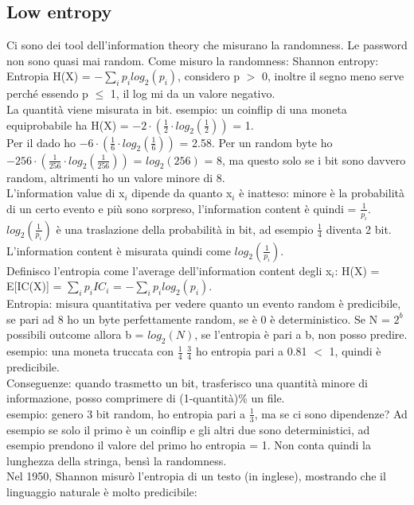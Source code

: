 \documentclass[16px]{article}
\begin{document}
\subsection{Low entropy}
Ci sono dei tool dell'information theory che misurano la randomness. Le password non sono quasi mai random. Come misuro la randomness: Shannon entropy:
Entropia H(X) = $-\sum\limits_{i}p_{i}log_{2}(p_{i})$, considero p $>$ 0, inoltre il segno meno serve perché essendo p $\leq$ 1, il log mi da un valore negativo.\\ La quantità viene misurata in bit. esempio: un coinflip di una moneta equiprobabile ha H(X) = $-2 \cdot (\frac{1}{2} \cdot log_{2}(\frac{1}{2}))$ = 1.\\ Per il dado ho $-6 \cdot (\frac{1}{6} \cdot log_{2}(\frac{1}{6}))$ = 2.58. Per un random byte ho $-256 \cdot (\frac{1}{256} \cdot log_{2}(\frac{1}{256}))$ = $log_{2}(256)$ = 8, ma questo solo se i bit sono davvero random, altrimenti ho un valore minore di 8.\\ L'information value di x$_{i}$ dipende da quanto x$_{i}$ è inatteso: minore è la probabilità di un certo evento e più sono sorpreso, l'information content è quindi = $\frac{1}{p_{i}}$.\\ $log_{2}(\frac{1}{p_{i}})$ è una traslazione della probabilità in bit, ad esempio $\frac{1}{4}$ diventa 2 bit. L'information content è misurata quindi come $log_{2}(\frac{1}{p_{i}})$.\\ Definisco l'entropia come l'average dell'information content degli x$_{i}$: H(X) = E[IC(X)] = $\sum\limits_{i}p_{i}IC_{i}$ = $-\sum\limits_{i}p_{i}log_{2}(p_{i})$.\\ Entropia: misura quantitativa per vedere quanto un evento random è predicibile, se pari ad 8 ho un byte perfettamente random, se è 0 è deterministico. Se N = $2^b$ possibili outcome allora b = $log_{2}(N)$, se l'entropia è pari a b, non posso predire. esempio: una moneta truccata con $\frac{1}{4}$ $\frac{3}{4}$ ho entropia pari a 0.81 $<$ 1, quindi è predicibile.\\ Conseguenze: quando trasmetto un bit, trasferisco una quantità minore di informazione, posso comprimere di (1-quantità)\% un file.\\
esempio: genero 3 bit random, ho entropia pari a $\frac{1}{3}$, ma se ci sono dipendenze? Ad esempio se solo il primo è un coinflip e gli altri due sono deterministici, ad esempio prendono il valore del primo ho entropia = 1. Non conta quindi la lunghezza della stringa, bensì la randomness.\\ Nel 1950, Shannon misurò l'entropia di un testo (in inglese), mostrando che il linguaggio naturale è molto predicibile:\\
\end{document}
